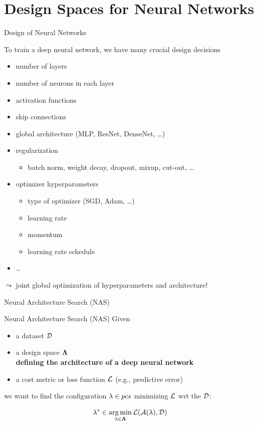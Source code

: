 \section{Design Spaces for Neural Networks}
\begin{frame}[c]{Design of Neural Networks}

To train a deep neural network, we have many crucial design decisions \hands
\pause

\begin{itemize}
  \item number of layers
  \item number of neurons in each layer
  \item activation functions
  \item skip connections
  \item global architecture (MLP, ResNet, DenseNet, \ldots)
  \item regularization
  \begin{itemize}
    \item batch norm, weight decay, dropout, mixup, cut-out, \ldots 
  \end{itemize}
  \item optimizer hyperparameters
  \begin{itemize}
    \item type of optimizer (SGD, Adam, \ldots)
    \item learning rate
    \item momentum
    \item learning rate schedule
  \end{itemize}
  \item \ldots
\end{itemize}

$\leadsto$ joint global optimization of hyperparameters and architecture!

\end{frame}
\begin{frame}[c]{Neural Architecture Search (NAS)}

\begin{block}{Neural Architecture Search (NAS)}
Given
\begin{itemize}
  \item a dataset $\mathcal{D}$
  \item a design space $\mathbf{\Lambda}$\\ \textbf{defining the architecture of a deep neural network}
  \item a cost metric or loss function $\mathcal{L}$ (e.g., predictive error)
\end{itemize}
we want to find the configuration $\mathbf{\lambda} \in pcs$ minimizing $\mathcal{L}$ wrt the $\mathcal{D}$:

\begin{equation}
\mathbf{\lambda}^* \in \operatorname*{arg\,min}_{\mathbf{\lambda} \in \mathbf{\Lambda}} \mathcal{L}(\mathcal{A}(\mathbf{\lambda}), \mathcal{D}) \nonumber
\end{equation}
\end{block}

\end{frame}
